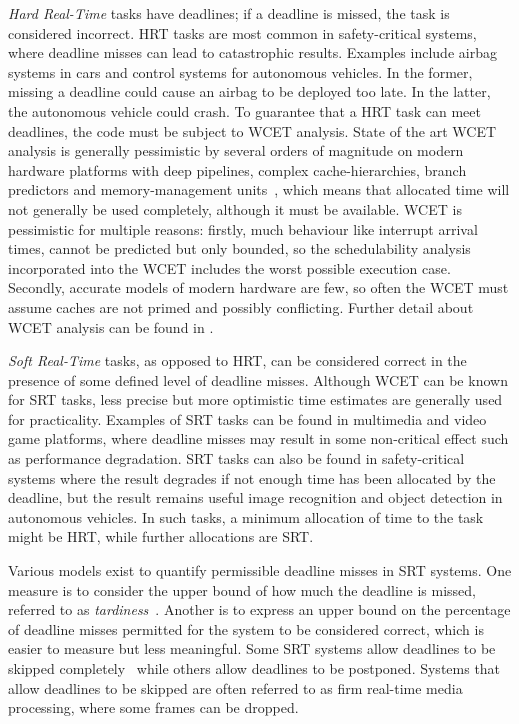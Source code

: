 \emph{Hard Real-Time} tasks have deadlines; if a deadline is missed,
the task is considered incorrect. \gls{HRT} tasks are most common in safety-critical systems, where
deadline misses can lead to catastrophic results.  Examples include airbag systems
in cars and control systems for autonomous vehicles.  In the former, missing a deadline could cause
an airbag to be deployed too late.  In the latter, the autonomous vehicle could crash.  To guarantee
that a \gls{HRT} task can meet deadlines, the code must be subject to {\gls{WCET}} analysis. State
of the art {\gls{WCET}} analysis is generally pessimistic by several orders of magnitude on modern
hardware platforms with deep pipelines, complex cache-hierarchies, branch predictors and
memory-management units~\citep{Wilhelm_EEHTWBFHMMPPSS_08}, which
means that allocated time will not generally be used completely, although it must be available.
WCET is pessimistic for multiple reasons: firstly, much behaviour like interrupt arrival times, 
cannot be predicted but only
bounded, so the schedulability analysis incorporated into the WCET includes the worst possible execution case. Secondly, accurate models of modern
hardware are few, so often the WCET must assume caches are not primed and possibly conflicting. 
Further detail about {\gls{WCET}} analysis can be found in \citet{Lv_GZDYZ_09}.

\emph{Soft Real-Time} tasks, as opposed to \gls{HRT}, can be
considered correct in the presence of some defined level of deadline misses. Although {\gls{WCET}}
can be known for {\gls{SRT}} tasks, less precise but more optimistic time estimates are generally
used for practicality.  Examples of \gls{SRT} tasks can be found in multimedia and video game platforms,
where deadline misses may result in some non-critical effect such as performance degradation.
\gls{SRT} tasks can also be found in safety-critical systems where the result degrades if not enough
time has been
allocated by the deadline, but the result remains useful \eg image recognition and object detection
in autonomous vehicles. In such tasks, a minimum allocation of time to the task might be \gls{HRT},
while further allocations are \gls{SRT}.

Various models exist to quantify permissible deadline misses in \gls{SRT} systems.  One measure is
to consider the upper bound of how much the deadline is missed, referred to as
\emph{tardiness}~\citep{Devi:phd}.  Another is to express an upper bound on the percentage of
deadline misses permitted for the system to be considered correct, which is easier to measure but
less meaningful. Some \gls{SRT} systems allow deadlines to be skipped
completely~\citep{Koren_Shasha_95} while others allow deadlines to be postponed. Systems that allow
deadlines to be skipped are often referred to as firm real-time \eg media processing, where some
frames can be dropped. 

